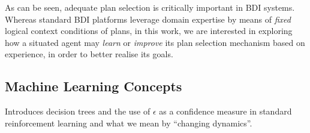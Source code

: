 As can be seen, adequate plan selection is critically important in BDI systems. Whereas standard BDI platforms leverage domain expertise by means of \emph{fixed} logical context conditions of plans, in this work, we are interested in exploring how a situated agent may \emph{learn} or \emph{improve} its plan selection mechanism based on experience, in order to better realise its goals.

\subsection{Machine Learning Concepts}
Introduces decision trees and the use of $\epsilon$ as a confidence measure in standard reinforcement learning and what we mean by ``changing dynamics''.

\newpage